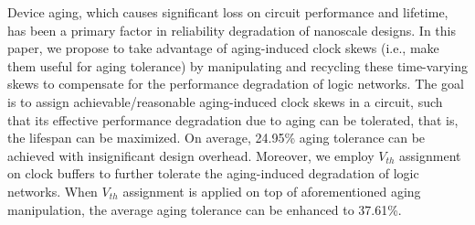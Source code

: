 Device aging, which causes significant loss on circuit performance and lifetime, has been a primary factor in reliability degradation of nanoscale designs. In this paper, we propose to take advantage of aging-induced clock skews (i.e., make them useful for aging tolerance) by manipulating and recycling these time-varying skews to compensate for the performance degradation of logic networks. The goal is to assign achievable/reasonable aging-induced clock skews in a circuit, such that its effective performance degradation due to aging can be tolerated, that is, the lifespan can be maximized.  On average, 24.95\% aging tolerance can be achieved with insignificant design overhead. Moreover, we employ $V_{th}$ assignment on clock buffers to further tolerate the aging-induced degradation of logic networks. When $V_{th}$ assignment is applied on top of aforementioned aging manipulation, the average aging tolerance can be enhanced to 37.61\%.
